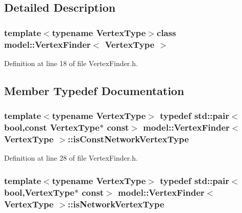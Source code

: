\subsection{Detailed Description}
\subsubsection*{template$<$typename Vertex\+Type$>$class model\+::\+Vertex\+Finder$<$ Vertex\+Type $>$}



Definition at line 18 of file Vertex\+Finder.\+h.



\subsection{Member Typedef Documentation}
\hypertarget{classmodel_1_1_vertex_finder_a0aae6271195a839940b5f3be47ffefc6}{}
\subsubsection[{is\+Const\+Network\+Vertex\+Type}]{\setlength{\rightskip}{0pt plus 5cm}template$<$typename Vertex\+Type$>$ typedef std\+::pair$<$bool,const Vertex\+Type$\ast$ const$>$ {\bf model\+::\+Vertex\+Finder}$<$ Vertex\+Type $>$\+::{\bf is\+Const\+Network\+Vertex\+Type}}\label{classmodel_1_1_vertex_finder_a0aae6271195a839940b5f3be47ffefc6}


Definition at line 28 of file Vertex\+Finder.\+h.

\hypertarget{classmodel_1_1_vertex_finder_a580eb0d98c227cf1bc3454129f7013be}{}
\subsubsection[{is\+Network\+Vertex\+Type}]{\setlength{\rightskip}{0pt plus 5cm}template$<$typename Vertex\+Type$>$ typedef std\+::pair$<$bool,Vertex\+Type$\ast$ const$>$ {\bf model\+::\+Vertex\+Finder}$<$ Vertex\+Type $>$\+::{\bf is\+Network\+Vertex\+Type}}\label{classmodel_1_1_vertex_finder_a580eb0d98c227cf1bc3454129f7013be}


